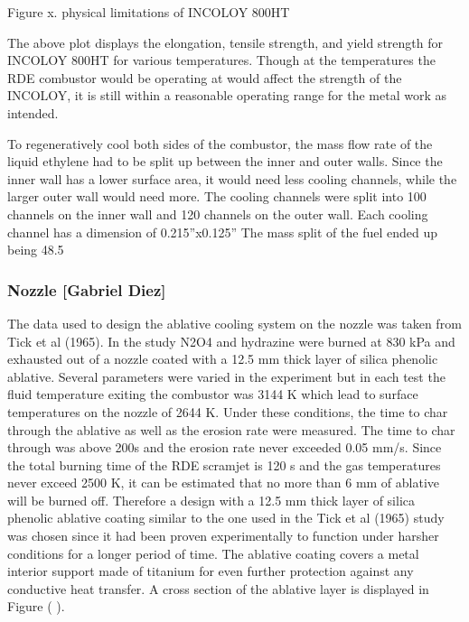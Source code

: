 Figure x. physical limitations of INCOLOY 800HT


The above plot displays the elongation, tensile strength, and yield strength for INCOLOY 800HT for various temperatures. Though at the temperatures the RDE combustor would be operating at would affect the strength of the INCOLOY, it is still within a reasonable operating range for the metal work as intended.

To regeneratively cool both sides of the combustor, the mass flow rate of the liquid ethylene had to be split up between the inner and outer walls. Since the inner wall has a lower surface area, it would need less cooling channels, while the larger outer wall would need more. The cooling channels were split into 100 channels on the inner wall and 120 channels on the outer wall. Each cooling channel has a dimension of 0.215”x0.125” The mass split of the fuel ended up being 48.5%

\subsubsection{Nozzle [Gabriel Diez]}

The data used to design the ablative cooling system on the nozzle was taken from Tick et al (1965). In the study N2O4 and hydrazine were burned at 830 kPa and exhausted out of a nozzle coated with a 12.5 mm thick layer of silica phenolic ablative. Several parameters were varied in the experiment but in each test the fluid temperature exiting the combustor was 3144 K which lead to surface temperatures on the nozzle of 2644 K. Under these conditions, the time to char through the ablative as well as the erosion rate were measured. The time to char through was above 200s and the erosion rate never exceeded 0.05 mm/s. Since the total burning time of the RDE scramjet is 120 s and the gas temperatures never exceed 2500 K, it can be estimated that no more than 6 mm of ablative will be burned off. Therefore a design with a 12.5 mm thick layer of silica phenolic ablative coating similar to the one used in the Tick et al (1965) study was chosen since it had been proven experimentally to function under harsher conditions for a longer period of time. The ablative coating covers a metal interior support made of titanium for even further protection against any conductive heat transfer. A cross section of the ablative layer is displayed in Figure ( ).


